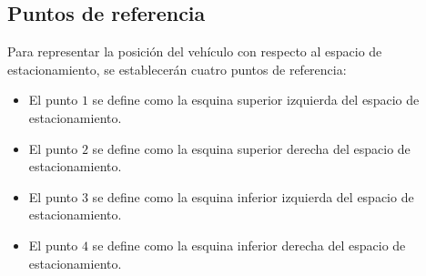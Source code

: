 \subsection{Puntos de referencia}
Para representar la posición del vehículo con respecto al espacio de estacionamiento, se establecerán cuatro puntos de referencia:
\begin{itemize}
    \item El punto $1$ se define como la esquina superior izquierda del espacio de estacionamiento.
    \item El punto $2$ se define como la esquina superior derecha del espacio de estacionamiento.
    \item El punto $3$ se define como la esquina inferior izquierda del espacio de estacionamiento.
    \item El punto $4$ se define como la esquina inferior derecha del espacio de estacionamiento.
\end{itemize}
